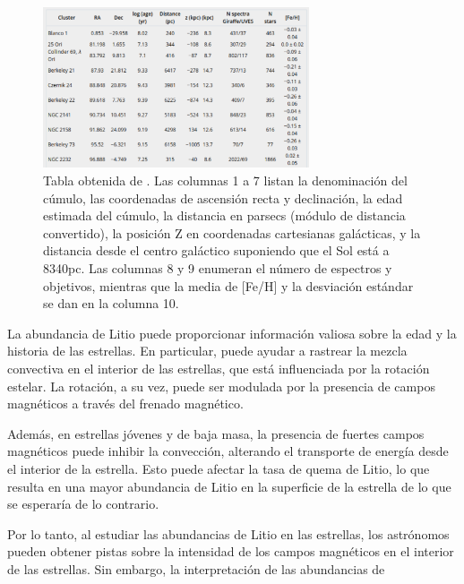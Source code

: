 \begin{longtable}[c]{|l l l l || c c c c c c c c c c|}
	\label{tab:oc_reduced_list}	
\end{longtable}
\newpage
{}
\recalctypearea


\begin{figure}
	\centering
	\includegraphics[width=0.7\textwidth]{img/tesis/open_cluster_sample.pdf}
	\caption{Tabla obtenida de \cite{Bragaglia2022}. Las columnas 1 a 7 listan la denominación del cúmulo, las coordenadas de ascensión recta y declinación, la edad estimada del cúmulo, la distancia en parsecs (módulo de distancia convertido), la posición Z en coordenadas cartesianas galácticas, y la distancia desde el centro galáctico suponiendo que el Sol está a 8340pc. Las columnas 8 y 9 enumeran el número de espectros y objetivos, mientras que la media de [Fe/H] y la desviación estándar se dan en la columna 10.}
	\label{fig:open_cluster_sample}
\end{figure}




La abundancia de Litio puede proporcionar información valiosa sobre la edad y la historia de las estrellas. En particular, puede ayudar a rastrear la mezcla convectiva en el interior de las estrellas, que está influenciada por la rotación estelar. La rotación, a su vez, puede ser modulada por la presencia de campos magnéticos a través del frenado magnético.

Además, en estrellas jóvenes y de baja masa, la presencia de fuertes campos magnéticos puede inhibir la convección, alterando el transporte de energía desde el interior de la estrella. Esto puede afectar la tasa de quema de Litio, lo que resulta en una mayor abundancia de Litio en la superficie de la estrella de lo que se esperaría de lo contrario.

Por lo tanto, al estudiar las abundancias de Litio en las estrellas, los astrónomos pueden obtener pistas sobre la intensidad de los campos magnéticos en el interior de las estrellas. Sin embargo, la interpretación de las abundancias de

